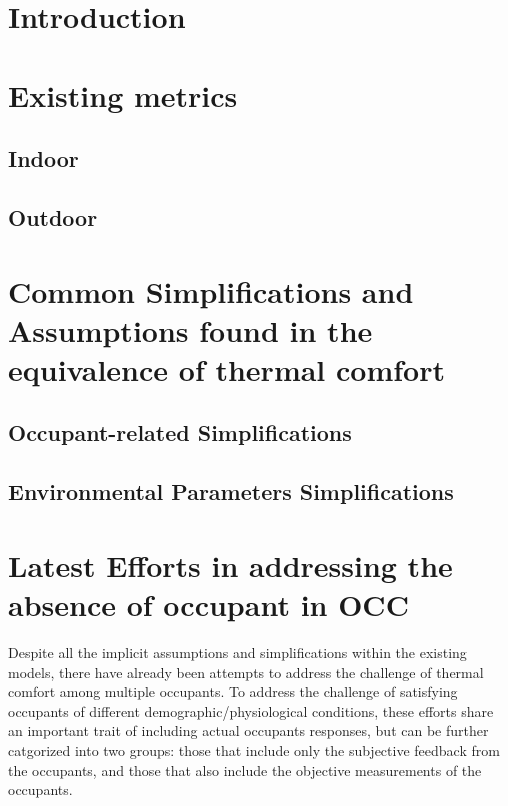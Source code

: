 \documentclass[review]{elsarticle}
\begin{document}
\section{Introduction}


\section{Existing metrics}
    \subsection{Indoor}
    
    \subsection{Outdoor} 
    

\section{Common Simplifications and Assumptions found in the equivalence of thermal comfort}
    \subsection{Occupant-related Simplifications}
    
    \subsection{Environmental Parameters Simplifications}
    
%         
%         
\section{Latest Efforts in addressing the absence of occupant in OCC}
Despite all the implicit assumptions and simplifications within the existing models, there have already been attempts to address the challenge of thermal comfort among multiple occupants. To address the challenge of satisfying occupants of different demographic/physiological conditions, these efforts share an important trait of including actual occupants responses, but can be further catgorized into two groups: those that include only the subjective feedback from the occupants, and those that also include the objective measurements of the occupants.\cite{bortolini_analysis_2019}
\end{document}
